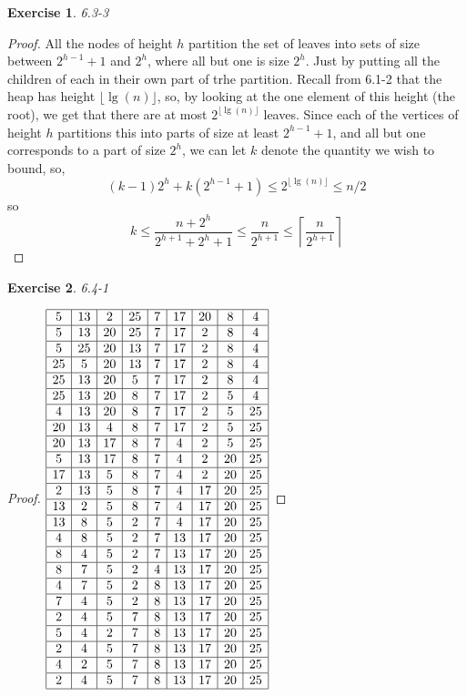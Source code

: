 \documentclass{article}
\newtheorem{th1}{Exercise}
\begin{document}
\begin{th1}\label{ex9}
6.3-3
\end{th1}
\begin{proof}
All the nodes of height $h$ partition the set of leaves into sets of size between $2^{h-1}+1$ and $2^h$, where all but one is size $2^h$. Just by putting all the children of each in their own part of trhe partition. Recall from 6.1-2 that the heap has height $\lfloor \lg(n)\rfloor$, so, by looking at the one element of this height (the root), we get that there are at most $ 2^{\lfloor \lg(n)\rfloor}$ leaves. Since each of the vertices of height $h$ partitions this into parts of size at least $2^{h-1}+1$, and all but one corresponds to a part of size $2^h$, we can let $k$ denote the quantity we wish to bound, so,
\[
(k-1)2^h + k(2^{h-1}+1) \le 2^{\lfloor \lg(n) \rfloor} \le n/2
\]
so
\[
k \le  \frac{n+2^h}{2^{h+1} + 2^{h}+1 }\le \frac{n}{2^{h+1}} \le \left\lceil \frac{n}{2^{h+1}}\right\rceil
\]
\end{proof}
\begin{th1}\label{ex10}
6.4-1
\end{th1}
\begin{proof}
$
\begin{array}{|c|c|c|c|c|c|c|c|c|}
\hline
5&13&2&25&7&17&20&8&4\\
\hline
5&13&20&25&7&17&2&8&4\\
\hline
5&25&20&13&7&17&2&8&4\\
\hline
25&5&20&13&7&17&2&8&4\\
\hline
25&13&20&5&7&17&2&8&4\\
\hline
25&13&20&8&7&17&2&5&4\\
\hline
4&13&20&8&7&17&2&5&25\\
\hline
20&13&4&8&7&17&2&5&25\\
\hline
20&13&17&8&7&4&2&5&25\\
\hline
5&13&17&8&7&4&2&20&25\\
\hline
17&13&5&8&7&4&2&20&25\\
\hline
2&13&5&8&7&4&17&20&25\\
\hline
13&2&5&8&7&4&17&20&25\\
\hline
13&8&5&2&7&4&17&20&25\\
\hline
4&8&5&2&7&13&17&20&25\\
\hline
8&4&5&2&7&13&17&20&25\\
\hline
8&7&5&2&4&13&17&20&25\\
\hline
4&7&5&2&8&13&17&20&25\\
\hline
7&4&5&2&8&13&17&20&25\\
\hline
2&4&5&7&8&13&17&20&25\\
\hline
5&4&2&7&8&13&17&20&25\\
\hline
2&4&5&7&8&13&17&20&25\\
\hline
4&2&5&7&8&13&17&20&25\\
\hline
2&4&5&7&8&13&17&20&25\\
\hline
\end{array}
$
\end{proof}
\end{document}
